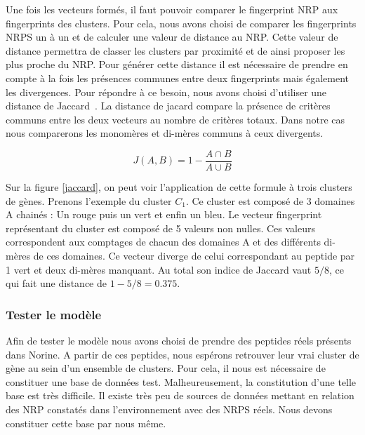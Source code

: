 
Une fois les vecteurs formés, il faut pouvoir comparer le fingerprint NRP aux fingerprints des clusters.
Pour cela, nous avons choisi de comparer les fingerprints NRPS un à un et de calculer une valeur de distance au NRP.
Cette valeur de distance permettra de classer les clusters par proximité et de ainsi proposer les plus proche du NRP.
Pour générer cette distance il est nécessaire de prendre en compte à la fois les présences communes entre deux fingerprints mais également les divergences.
Pour répondre à ce besoin, nous avons choisi d'utiliser une distance de Jaccard~\cite{jaccard_etude_1901}.
La distance de jacard compare la présence de critères communs entre les deux vecteurs au nombre de critères totaux.
Dans notre cas nous comparerons les monomères et di-mères communs à ceux divergents.

\begin{equation}
  J(A,B) = 1 - \frac{A \cap B}{A \cup B}
\end{equation}

Sur la figure \ref{jaccard}, on peut voir l'application de cette formule à trois clusters de gènes.
Prenons l'exemple du cluster $C_1$.
Ce cluster est composé de 3 domaines A chainés : Un rouge puis un vert et enfin un bleu.
Le vecteur fingerprint représentant du cluster est composé de 5 valeurs non nulles.
Ces valeurs correspondent aux comptages de chacun des domaines A et des différents di-mères de ces domaines.
Ce vecteur diverge de celui correspondant au peptide par 1 vert et deux di-mères manquant.
Au total son indice de Jaccard vaut $5 / 8$, ce qui fait une distance de $1 - 5/8 = 0.375$.





\subsubsection{Tester le modèle}

Afin de tester le modèle nous avons choisi de prendre des peptides réels présents dans Norine.
A partir de ces peptides, nous espérons retrouver leur vrai cluster de gène au sein d'un ensemble de clusters.
Pour cela, il nous est nécessaire de constituer une base de données test.
Malheureusement, la constitution d'une telle base est très difficile.
Il existe très peu de sources de données mettant en relation des NRP constatés dans l'environnement avec des NRPS réels.
Nous devons constituer cette base par nous même.

